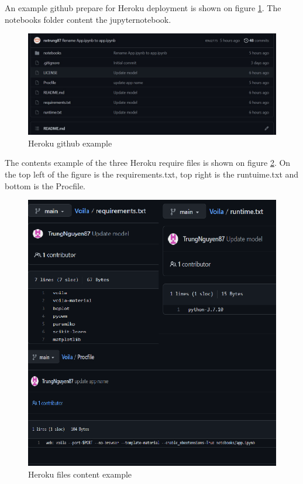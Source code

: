 An example github prepare for Heroku deployment is shown on figure \ref{figure:Heroku github}. The notebooks folder content the jupyternotebook. 

\begin{figure}[H]
	\centering
    \includegraphics[width=0.8\columnwidth]{Pictures/Hroku_git.jpg}
	\caption[Short title]{Heroku github example}
	\label{figure:Heroku github}
\end{figure}

The contents example of the three Heroku require files is shown on figure \ref{figure:Heroku file content}. On the top left of the figure is the requirements.txt, top right is the runtuime.txt and bottom is the Procfile.

\begin{figure}[H]
	\centering
    \includegraphics[width=0.8\columnwidth]{Pictures/Voila_heroku_files.png}
	\caption[Short title]{Heroku files content example}
	\label{figure:Heroku file content}
\end{figure}

\newpage

